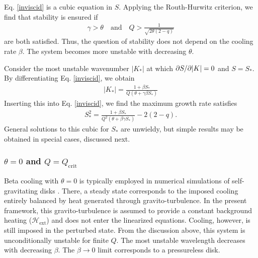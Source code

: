 Eq. \ref{inviscid} is a cubic equation in $S$. Applying the
Routh-Hurwitz criterion, we find that stability is ensured if 
\begin{align}
  \gamma > \theta \quad \text{and} \quad 
  Q > \frac{1}{\sqrt{2\theta(2-q)}} 
\end{align}
are both satisfied. Thus, the question of stability does not depend on
the cooling rate $\beta$. The system becomes more unstable with
decreasing $\theta$.   

Consider the most unstable wavenumber $|K_*|$ at which $\partial S/\partial |K| =
0$ and $S = 
S_*$. By differentiating Eq. \ref{inviscid}, we obtain 
\begin{align}\label{kstar}
  |K_*| = \frac{1+\beta S_*}{Q\left(\theta + \gamma \beta S_*\right)}
\end{align}
Inserting this into Eq. \ref{inviscid}, we find the maximum growth
rate satisfies
\begin{align}\label{inviscid_max}
  S_*^2 = \frac{1+\beta S_*}{Q^2\left(\theta + \beta\gamma S_*\right)}
  - 2(2-q).
\end{align}
General solutions to this cubic for $S_*$ are unwieldy, but simple
results may be obtained in special cases, discussed next. 

\subsubsection{$\theta = 0$ and $Q=Q_\mathrm{crit}$}  
Beta cooling with $\theta=0$ is typically employed in numerical
simulations of self-gravitating disks \citep{gammie01}. There, 
a steady state corresponds to the imposed cooling entirely balanced by heat generated through 
gravito-turbulence. In the present framework, this gravito-turbulence
is assumed to provide a constant 
background heating ($\mathcal{H}_\mathrm{ext}$) and does
not enter the linearized equations. Cooling, however, is still imposed in the perturbed state. 
From the discussion above, this system is unconditionally unstable for
finite $Q$. The most unstable wavelength decreases with decreasing
$\beta$. The $\beta\to0$ limit corresponds to a pressureless disk.  

